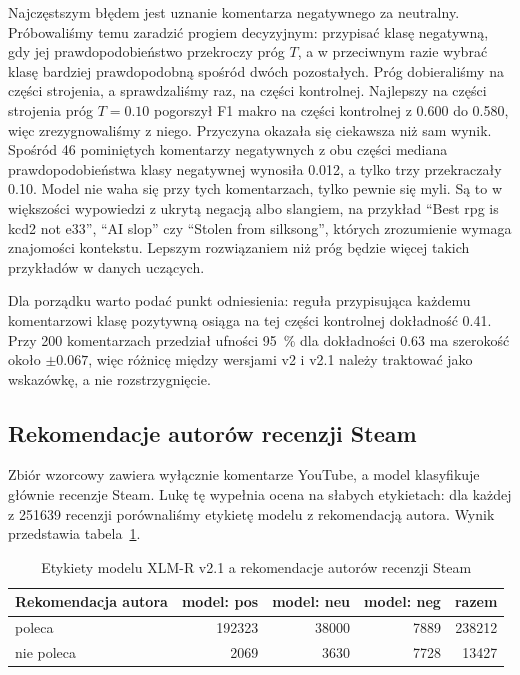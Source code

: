 Najczęstszym błędem jest uznanie komentarza negatywnego za neutralny.
Próbowaliśmy temu zaradzić progiem decyzyjnym: przypisać klasę negatywną, gdy jej prawdopodobieństwo przekroczy próg $T$, a w przeciwnym razie wybrać klasę bardziej prawdopodobną spośród dwóch pozostałych.
Próg dobieraliśmy na części strojenia, a sprawdzaliśmy raz, na części kontrolnej.
Najlepszy na części strojenia próg $T=\num{0.10}$ pogorszył F1 makro na części kontrolnej z \num{0.600} do \num{0.580}, więc zrezygnowaliśmy z niego.
Przyczyna okazała się ciekawsza niż sam wynik.
Spośród 46 pominiętych komentarzy negatywnych z obu części mediana prawdopodobieństwa klasy negatywnej wynosiła \num{0.012}, a tylko trzy przekraczały \num{0.10}.
Model nie waha się przy tych komentarzach, tylko pewnie się myli.
Są to w większości wypowiedzi z ukrytą negacją albo slangiem, na przykład \enquote{Best rpg is kcd2 not e33}, \enquote{AI slop} czy \enquote{Stolen from silksong}, których zrozumienie wymaga znajomości kontekstu.
Lepszym rozwiązaniem niż próg będzie więcej takich przykładów w danych uczących.

Dla porządku warto podać punkt odniesienia: reguła przypisująca każdemu komentarzowi klasę pozytywną osiąga na tej części kontrolnej dokładność \num{0.41}.
Przy 200 komentarzach przedział ufności \qty{95}{\percent} dla dokładności \num{0.63} ma szerokość około $\pm\num{0.067}$, więc różnicę między wersjami v2 i v2.1 należy traktować jako wskazówkę, a nie rozstrzygnięcie.

\subsection{Rekomendacje autorów recenzji Steam}
\label{sec:eval-weak-labels}

Zbiór wzorcowy zawiera wyłącznie komentarze YouTube, a model klasyfikuje głównie recenzje Steam.
Lukę tę wypełnia ocena na słabych etykietach: dla każdej z \num{251639} recenzji porównaliśmy etykietę modelu z rekomendacją autora.
Wynik przedstawia tabela~\ref{tab:weak-confusion}.

\begin{table}[hbp]
  \caption{Etykiety modelu XLM-R v2.1 a rekomendacje autorów recenzji Steam}
  \label{tab:weak-confusion}
  \centering
  \small
  \begin{tabular}{|l|r|r|r|r|}
    \hline
    Rekomendacja autora & model: pos      & model: neu      & model: neg     & razem           \\
    \hline
    poleca              & \num{192323}    & \num{38000}     & \num{7889}     & \num{238212}    \\
    \hline
    nie poleca          & \num{2069}      & \num{3630}      & \num{7728}     & \num{13427}     \\
    \hline
  \end{tabular}
\end{table}

